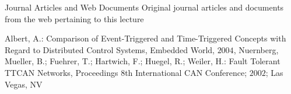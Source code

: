 \begin{frame}
\vspace*{2ex}

Journal Articles and Web Documents
Original journal articles and documents from the web pertaining to this lecture

\vspace*{1ex}

  \begin{thebibliography}{9}
  \beamertemplatearticlebibitems

    Albert, A.: Comparison of Event-Triggered and Time-Triggered Concepts with
    Regard to Distributed Control Systems, Embedded World, $2004$, Nuernberg,
    Mueller, B.; Fuehrer, T.; Hartwich, F.; Huegel, R.; Weiler, H.:    Fault
    Tolerant TTCAN Networks, Proceedings $8$th International CAN Conference; $2002$; Las
    Vegas, NV %



  \end{thebibliography}

\end{frame}

